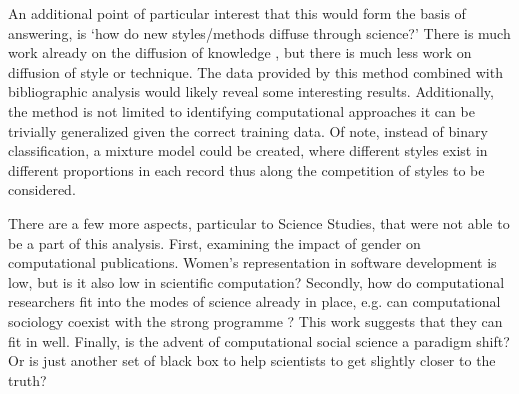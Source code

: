 \documentclass[12pt, a4paper]{article}
\begin{document}
An additional point of particular interest that this would form the basis of answering, is `how do new styles/methods diffuse through science?' There is much work already on the diffusion of knowledge \citep{griliches1960hybrid} \citep{crane1972invisible} \citep{evans2010industry}, but there is much less work on diffusion of style or technique. The data provided by this method combined with bibliographic analysis would likely reveal some interesting results. Additionally, the method is not limited to identifying computational approaches it can be trivially generalized given the correct training data. Of note, instead of binary classification, a mixture model could be created, where different styles exist in different proportions in each record thus along the competition of styles to be considered.

There are a few more aspects, particular to Science Studies, that were not able to be a part of this analysis. First, examining the impact of gender on computational publications. Women's representation in software development is low, but is it also low in scientific computation? Secondly, how do computational researchers fit into the modes of science already in place, e.g. can computational sociology coexist with the strong programme \citep{bloor1976strong}? This work suggests that they can fit in well. Finally, is the advent of computational social science a paradigm shift? Or is just another set of black box to help scientists to get slightly closer to the truth?

\newpage
\singlespacing
\setcounter{page}{1}
{}




\appendix
\end{document}
